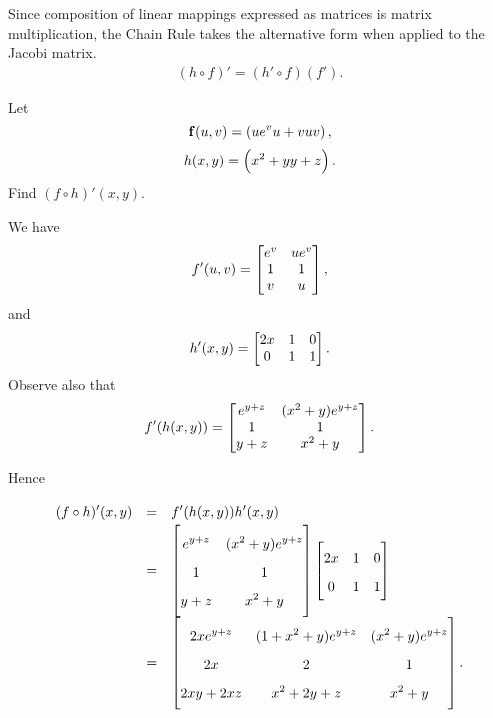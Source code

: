Since composition of linear mappings expressed as matrices is matrix
multiplication, the Chain Rule takes the alternative form when
applied to the Jacobi matrix. \begin{eqnarray} (h\circ f)' =
(h'\circ f)(f'). \label{eqn:chainrulejacobi}
\end{eqnarray}
\begin{exa}
Let$$\mathbf{ f}(u,v) = \left( ue^v \\ u + v \\ uv  \right),$$
$$h(x,y) = \left( x^2 + y \\ y + z \right).$$Find $(f\circ h)'(x,y)$.
\end{exa}
\begin{solu} We have
$$f'(u,v) = \begin{bmatrix} e^v & ue^v \cr 1 & 1 \cr v & u \cr
\end{bmatrix},$$and
$$h'(x,y) = \begin{bmatrix} 2x & 1 & 0 \cr 0 & 1 & 1 \cr
\end{bmatrix}.$$Observe also  that
$$f'(h(x,y)) = \begin{bmatrix} e^{y + z} & (x^2 + y)e^{y + z} \cr 1 & 1 \cr y + z & x^2 + y \end{bmatrix}.$$


Hence
$$\renewcommand{\arraystretch}{1.7}{\everymath{\displaystyle}\begin{array}{lll}(f\circ h)'(x,y) & =  &  f'(h(x,y))h'(x,y) \\ & = &
\begin{bmatrix} e^{y + z} & (x^2 + y)e^{y + z} \cr 1 & 1 \cr y + z & x^2 + y \end{bmatrix} \begin{bmatrix} 2x & 1 & 0 \cr 0 & 1 & 1 \cr
\end{bmatrix} \\ &  = & \begin{bmatrix} 2xe^{y + z} & (1 + x^2 + y)e^{y +
z}& (x^2 + y)e^{y + z} \cr 2x & 2 & 1 \cr 2xy + 2xz & x^2 + 2y + z
& x^2 + y \cr
\end{bmatrix}. \end{array}}
\renewcommand{\arraystretch}{1}$$\end{solu}

